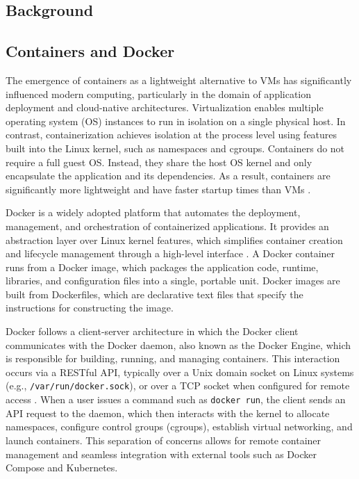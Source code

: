 \documentclass[12pt]{report}
\begin{document}
\begin{doublespace}
\chapter{Background}



\section{Containers and Docker}

The emergence of containers as a lightweight alternative to VMs has significantly influenced modern computing, particularly in the domain of application deployment and cloud-native architectures. Virtualization enables multiple operating system (OS) instances to run in isolation on a single physical host. In contrast, containerization achieves isolation at the process level using features built into the Linux kernel, such as namespaces and cgroups. Containers do not require a full guest OS. Instead, they share the host OS kernel and only encapsulate the application and its dependencies. As a result, containers are significantly more lightweight and have faster startup times than VMs \cite{sharma2016containers}.

Docker is a widely adopted platform that automates the deployment, management, and orchestration of containerized applications. It provides an abstraction layer over Linux kernel features, which simplifies container creation and lifecycle management through a high-level interface \cite{ostrowski2024containerd}. A Docker container runs from a Docker image, which packages the application code, runtime, libraries, and configuration files into a single, portable unit. Docker images are built from Dockerfiles, which are declarative text files that specify the instructions for constructing the image.

Docker follows a client-server architecture in which the Docker client communicates with the Docker daemon, also known as the Docker Engine, which is responsible for building, running, and managing containers. This interaction occurs via a RESTful API, typically over a Unix domain socket on Linux systems (e.g., \texttt{/var/run/docker.sock}), or over a TCP socket when configured for remote access \cite{mrdevsecops_dockerarchitecture}. When a user issues a command such as \texttt{docker run}, the client sends an API request to the daemon, which then interacts with the kernel to allocate namespaces, configure control groups (cgroups), establish virtual networking, and launch containers. This separation of concerns allows for remote container management and seamless integration with external tools such as Docker Compose and Kubernetes.


\end{doublespace}
\end{document}

